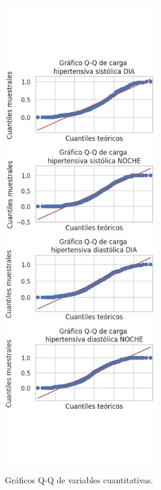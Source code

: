\begin{figure}[H]
	[0.45\linewidth]{\includegraphics[height=20cm]{./Figures/qqplot_dataset1b.png}}
	\caption{Gráficos Q-Q de variables cuantitativas.}\label{fig:qqplot_1}
\end{figure}

